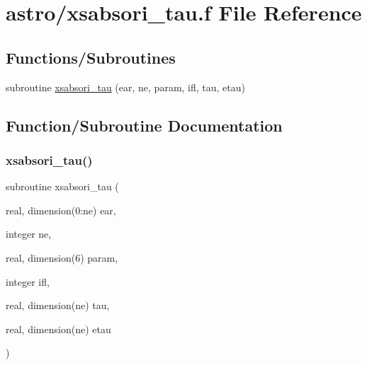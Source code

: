 \hypertarget{xsabsori__tau_8f}{}\section{astro/xsabsori\+\_\+tau.f File Reference}
\label{xsabsori__tau_8f}
\subsection*{Functions/\+Subroutines}
\begin{DoxyCompactItemize}
\item 
subroutine \hyperlink{xsabsori__tau_8f_abc953e3e385d7d68ed0a728a6aa7a20a}{xsabsori\+\_\+tau} (ear, ne, param, ifl, tau, etau)
\end{DoxyCompactItemize}


\subsection{Function/\+Subroutine Documentation}
\mbox{\label{xsabsori__tau_8f_abc953e3e385d7d68ed0a728a6aa7a20a}} 
\subsubsection{\texorpdfstring{xsabsori\+\_\+tau()}{xsabsori\_tau()}}
{\footnotesize\ttfamily subroutine xsabsori\+\_\+tau (\begin{DoxyParamCaption}\item[{real, dimension(0\+:ne)}]{ear,  }\item[{integer}]{ne,  }\item[{real, dimension(6)}]{param,  }\item[{integer}]{ifl,  }\item[{real, dimension(ne)}]{tau,  }\item[{real, dimension(ne)}]{etau }\end{DoxyParamCaption})}

